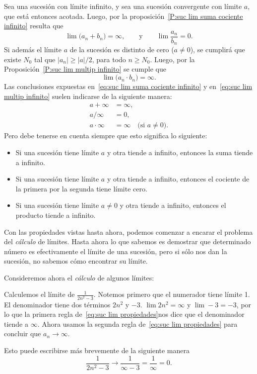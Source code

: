 Sea \sucbn una sucesión con límite infinito, y sea \sucan una sucesión convergente con límite $a$, que está entonces acotada.
Luego, por la proposición~\ref{P:suc lim suma cociente infinito} resulta que
\begin{equation}\label{eq:suc lim suma cociente infinito}
    \lim \big(a_n+b_n) = \infty,
    \qquad\text{y}\qquad
    \lim \frac{a_n}{b_n} = 0.
\end{equation}
Si además el límite $a$ de la sucesión \sucan es distinto de cero ($a\neq 0$), se cumplirá que existe $N_0$ tal que $|a_n| \ge |a|/2$, para todo $n\ge N_0$. Luego, por la Proposición~\ref{P:suc lim multip infinito} se cumple que
\begin{equation}\label{eq:suc lim multip infinito}
    \lim \big( a_n \cdot b_n ) = \infty.
\end{equation}
Las conclusiones expuestas en~\eqref{eq:suc lim suma cociente infinito} y en~\eqref{eq:suc lim multip infinito} suelen indicarse de la siguiente manera:
\begin{equation}\label{eq:suc lim propiedades}
    \begin{split}
        a+\infty &= \infty, \\
        a/\infty &= 0, \\
        a\cdot\infty &= \infty \quad\text{(si $a\neq 0$)}.
    \end{split}
\end{equation}
Pero debe tenerse en cuenta siempre que esto significa lo siguiente:
\begin{itemize}
    \item Si una sucesión tiene límite $a$ y otra tiende a infinito, entonces la suma tiende a infinito.
    \item Si una sucesión tiene límite $a$ y otra tiende a infinito, entonces el cociente de la primera por la segunda tiene límite cero.
    \item Si una sucesión tiene límite $a\neq0$ y otra tiende a infinito, entonces el producto tiende a infinito.
\end{itemize}

Con las propiedades vistas hasta ahora, podemos comenzar a encarar el problema del \emph{cálculo} de límites. Hasta ahora lo que sabemos es demostrar que determinado número es efectivamente el límite de una sucesión, pero si sólo nos dan la sucesión, no sabemos cómo encontrar su límite.

Consideremos ahora el \emph{cálculo} de algunos límites:

\begin{example}
    Calculemos el límite de $\frac{1}{2n^2-3}$. Notemos primero que el numerador tiene límite 1.
    El denominador tiene dos términos $2n^2$ y $-3$.
    $\lim 2n^2=\infty$ y $\lim -3 = -3$, por lo que la primera regla de~\eqref{eq:suc lim propiedades}nos dice que el denominador tiende a $\infty$.
    Ahora usamos la segunda regla de~\eqref{eq:suc lim propiedades} para concluir que $a_n \to \infty$.
    
    Esto puede escribirse más brevemente de la siguiente manera
    \[
\frac{1}{2n^2-3} \to \frac{1}{\infty - 3} = \frac{1}{\infty} = 0.
\]
\end{example}

